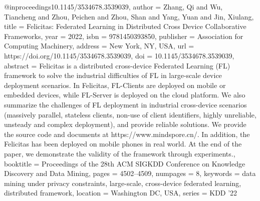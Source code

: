 @inproceedings{10.1145/3534678.3539039,
author = {Zhang, Qi and Wu, Tiancheng and Zhou, Peichen and Zhou, Shan and Yang, Yuan and Jin, Xiulang},
title = {Felicitas: Federated Learning in Distributed Cross Device Collaborative Frameworks},
year = {2022},
isbn = {9781450393850},
publisher = {Association for Computing Machinery},
address = {New York, NY, USA},
url = {https://doi.org/10.1145/3534678.3539039},
doi = {10.1145/3534678.3539039},
abstract = {Felicitas is a distributed cross-device Federated Learning (FL) framework to solve the industrial difficulties of FL in large-scale device deployment scenarios. In Felicitas, FL-Clients are deployed on mobile or embedded devices, while FL-Server is deployed on the cloud platform. We also summarize the challenges of FL deployment in industrial cross-device scenarios (massively parallel, stateless clients, non-use of client identifiers, highly unreliable, unsteady and complex deployment), and provide reliable solutions. We provide the source code and documents at https://www.mindspore.cn/. In addition, the Felicitas has been deployed on mobile phones in real world. At the end of the paper, we demonstrate the validity of the framework through experiments.},
booktitle = {Proceedings of the 28th ACM SIGKDD Conference on Knowledge Discovery and Data Mining},
pages = {4502–4509},
numpages = {8},
keywords = {data mining under privacy constraints, large-scale, cross-device federated learning, distributed framework},
location = {Washington DC, USA},
series = {KDD '22}
}
